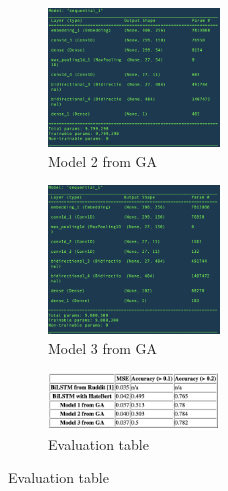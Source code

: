 \documentclass[11pt, natbib=false]{article}
\begin{document}
\newpage
\begin{figure}[h!]\ContinuedFloat
  \centering

  \begin{subfigure}[b]{1.0\linewidth}
  \centering
  \caption{Model 2 from GA}
  \includegraphics[width=0.5\textwidth]{./GA_model2.png}
  \end{subfigure}

  \begin{subfigure}[b]{1.0\linewidth}
  \centering
  \caption{Model 3 from GA}
  \includegraphics[width=0.5\textwidth]{./GA_model3.png}
  \end{subfigure}

  \begin{subfigure}[b]{1.0\linewidth}
  \centering
  \caption{Evaluation table}
  \includegraphics[width=0.5\textwidth]{./comparison_table.png}
  \end{subfigure}

\end{figure}
\end{document}
